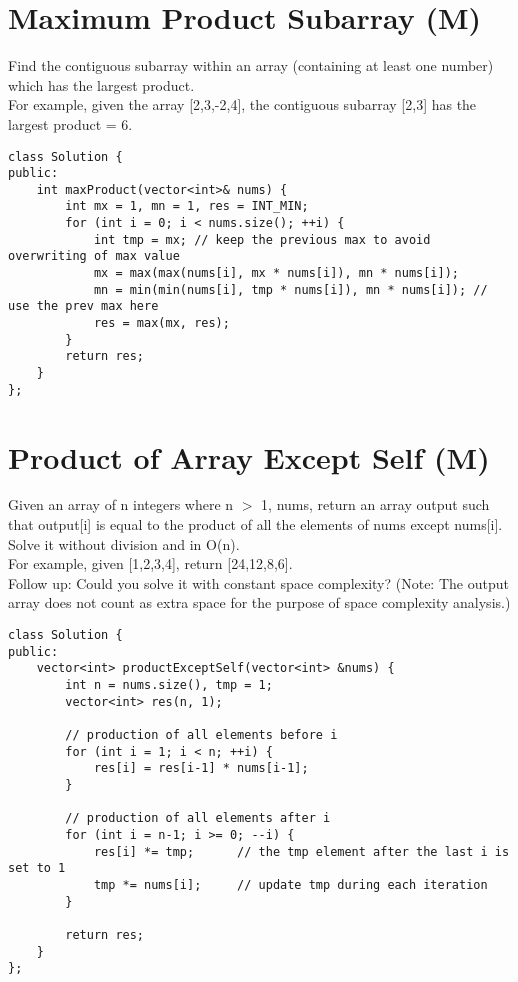 \section{Maximum Product Subarray (M)}
Find the contiguous subarray within an array (containing at least one number) which has the largest product.\\

For example, given the array [2,3,-2,4], the contiguous subarray [2,3] has the largest product = 6. \\

\begin{lstlisting}
class Solution {
public:
    int maxProduct(vector<int>& nums) {
        int mx = 1, mn = 1, res = INT_MIN;
        for (int i = 0; i < nums.size(); ++i) {
            int tmp = mx; // keep the previous max to avoid overwriting of max value
            mx = max(max(nums[i], mx * nums[i]), mn * nums[i]);
            mn = min(min(nums[i], tmp * nums[i]), mn * nums[i]); // use the prev max here
            res = max(mx, res);
        }
        return res;
    }
};
\end{lstlisting}


\section{Product of Array Except Self (M)}
Given an array of n integers where n $>$ 1, nums, return an array output such that output[i] is equal to the product of all the elements of nums except nums[i]. Solve it without division and in O(n). \\

For example, given [1,2,3,4], return [24,12,8,6].\\

Follow up: Could you solve it with constant space complexity? (Note: The output array does not count as extra space for the purpose of space complexity analysis.)\\

\begin{lstlisting}
class Solution {
public:
    vector<int> productExceptSelf(vector<int> &nums) {
        int n = nums.size(), tmp = 1;
        vector<int> res(n, 1);
        
        // production of all elements before i
        for (int i = 1; i < n; ++i) {
            res[i] = res[i-1] * nums[i-1];
        }
        
        // production of all elements after i
        for (int i = n-1; i >= 0; --i) {
            res[i] *= tmp;      // the tmp element after the last i is set to 1
            tmp *= nums[i];     // update tmp during each iteration
        }
        
        return res;
    }
};
\end{lstlisting}


